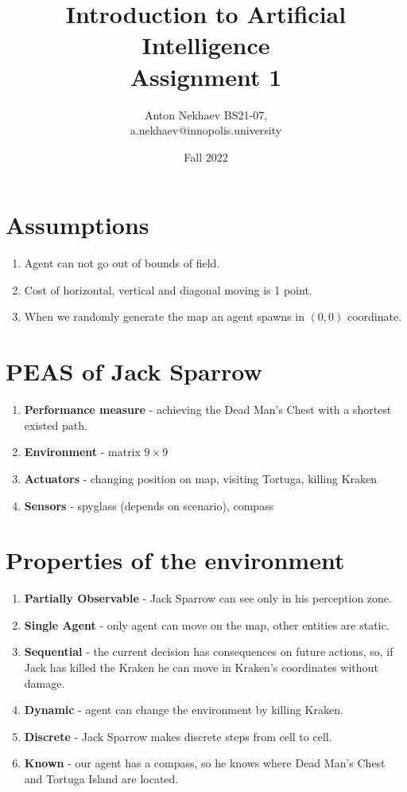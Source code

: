 \documentclass[a4paper]{article}
\title{Introduction to Artificial Intelligence \\ Assignment 1}
\author{Anton Nekhaev BS21-07, \\ a.nekhaev@innopolis.university}
\date{Fall 2022}
\begin{document}
\maketitle

\section{Assumptions}
\begin{enumerate}
  \item Agent can not go out of bounds of field.
  \item Cost of horizontal, vertical and diagonal moving is 1 point. 
  \item When we randomly generate the map an agent spawns in $(0, 0)$ coordinate.
\end{enumerate}

\section{PEAS of Jack Sparrow}
\begin{enumerate}
    \item[] \textbf{Performance measure} - achieving the Dead Man’s Chest with a shortest existed path. 
    \item[] \textbf{Environment} - matrix $9 \times 9$
    \item[] \textbf{Actuators} - changing position on map, visiting Tortuga, killing Kraken
    \item[] \textbf{Sensors} - spyglass (depends on scenario), compass
\end{enumerate}

\section{Properties of the environment}
\begin{enumerate}
    \item[] \textbf{Partially Observable} - Jack Sparrow can see only in his perception zone.
    \item[] \textbf{Single Agent} - only agent can move on the map, other entities are static.
    \item[] \textbf{Sequential} - the current decision has consequences on future actions, so, if Jack has killed the Kraken he can move in Kraken's coordinates without damage.
    \item[] \textbf{Dynamic} - agent can change the environment by killing Kraken.
    \item[] \textbf{Discrete} - Jack Sparrow makes discrete steps from cell to cell.
    \item[] \textbf{Known} - our agent has a compass, so he knows where Dead Man's Chest and Tortuga Island are located.
\end{enumerate}
\end{document}
